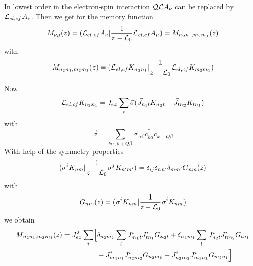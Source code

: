 In lowest order in the electron-spin interaction ${\cal QL}A_\nu$ can be replaced by ${\cal L}_{el,cf}A_\nu$.
Then we get for the memory function
$$
M_{\nu \mu}(z)= ({\cal L}_{el,cf}A_\nu \vert{1\over z- {\cal
L}_0}{\cal L}_{el,cf}A_\mu)=
M_{n_2n_1,m_2m_1}(z)
$$
with
$$
M_{n_2n_1,m_2m_1}(z)=({\cal L}_{el,cf} K_{n_2n_1}\vert{1\over z-{\cal
L}_0}{\cal L}_{el,cf} K_{m_2m_1})
$$

Now
$$
{\cal L}_{el,cf} K_{n_2n_1} = J_{ex}\sum_t \vec \sigma(\vec  J_{n_1t}
K_{n_2t} - \vec
J_{tn_2}K_{tn_1})
$$
with
$$
\vec \sigma = \sum_{k\alpha, k+Q\beta}\vec \sigma_{\alpha\beta}
c^\dagger_{k\alpha}c_{k+Q\beta}
$$
With help of the symmetry properties 
$$
( \sigma^i K_{nm}\vert {1\over z- {\cal L}_0}\sigma^j K_{n'm'})=
\delta_{ij}\delta_{nn'}\delta_{mm'}G_{nm}(z)
$$
with
$$
G_{nm}(z)=( \sigma^i K_{nm}\vert {1\over  {z-\cal L}_0}\sigma^i K_{nm})
$$
we obtain
\begin{eqnarray}
M_{n_2n_1,m_2m_1}(z)=J_{ex}^2\sum_i\Bigl[&
\delta_{n_2m_2}\sum_tJ^i_{m_1t}J^i_{tn_1}G_{n_2t}
+ \delta_{n_1m_1}\sum_tJ^i_{
n_2t}J^i_{tm_2}G_{tn_1}\nonumber \\
&-J^i_{m_1n_1}J^i_{n_2m_2}G_{n_2m_1}
-J^i_{n_2m_2}J^i_{m_1n_1}G_{m_2n_1}\Bigr]\nonumber
\end{eqnarray}


